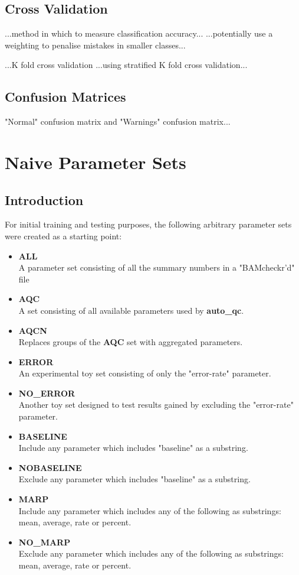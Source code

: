 \subsection{Cross Validation}

...method in which to measure classification accuracy...
...potentially use a weighting to penalise mistakes in smaller classes...

...K fold cross validation
...using stratified K fold cross validation...


\subsection{Confusion Matrices}
"Normal" confusion matrix and "Warnings" confusion matrix...


\section{Naive Parameter Sets}
\subsection{Introduction}

For initial training and testing purposes, the following arbitrary parameter
sets were created as a starting point:

\begin{itemize}
    \item \textbf{ALL} \hfill\\
        A parameter set consisting of all the summary numbers in a "BAMcheckr'd"
        file
    \item \textbf{AQC} \hfill\\
        A set consisting of all available parameters used by \textbf{auto\_qc}.
    \item \textbf{AQCN} \hfill\\
        Replaces groups of the \textbf{AQC} set with aggregated parameters.
    \item \textbf{ERROR} \hfill\\
        An experimental toy set consisting of only the "error-rate" parameter.
    \item \textbf{NO\_ERROR} \hfill\\
        Another toy set designed to test results gained by excluding the
        "error-rate" parameter.
    \item \textbf{BASELINE} \hfill\\
        Include any parameter which includes "baseline" as a substring.
    \item \textbf{NOBASELINE} \hfill\\
        Exclude any parameter which includes "baseline" as a substring.
    \item \textbf{MARP} \hfill\\
        Include any parameter which includes any of the following as substrings:
        mean, average, rate or percent.
    \item \textbf{NO\_MARP} \hfill\\
        Exclude any parameter which includes any of the following as substrings:
        mean, average, rate or percent.
\end{itemize}

